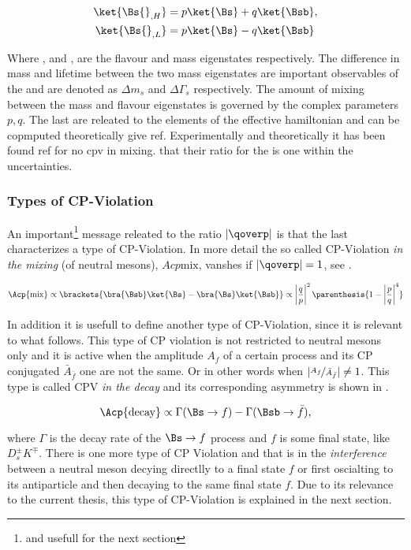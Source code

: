 \begin{align}
\ket{\Bs{}_{,H}} &= p \ket{\Bs} + q \ket{\Bsb}, \nonumber \\
\ket{\Bs{}_{,L}} &= p \ket{\Bs} - q \ket{\Bsb}
\label{bs_mass_eigen}
\end{align}

\noindent Where \ket{\Bs}, \ket{\Bsb} and ,  are the flavour and mass
eigenstates respectively. The difference in mass and lifetime between the two mass eigenstates are important
observables of the \BBbarSyst and are denoted as $\Delta m_s$ and $\Delta\Gamma_s$ respectively.
The amount of mixing between the mass and flavour eigenstates is governed by
the complex parameters $p,q$. The last are releated to the elements of the effective hamiltonian and can be
copmputed theoretically{\color{red} give ref}. Experimentally and theoretically it has been found{\color{red} ref for no cpv in mixing.}
that their ratio for the \BBbarSyst is one within the uncertainties.

\subsubsection{Types of CP-Violation}
An important\footnote{and usefull for the next section} message releated to the ratio $|\qoverp|$ is that
the last characterizes a type of CP-Violation. In more detail the so called CP-Violation {\it in the mixing} (of neutral mesons),
$Acp{\text{mix}}$, vanshes if $|\qoverp|= 1$, see .

\begin{equation}
\Acp{\text{mix}} \propto \brackets{\bra{\Bsb}\ket{\Bs} - \bra{\Bs}\ket{\Bsb}} \propto \left|\frac{q}{p}\right|^2 \parenthesis{ 1 - \left|\frac{p}{q}\right|^4}
\label{cpv_mixing}
\end{equation}

\noindent In addition it is usefull to define another type of CP-Violation, since it is relevant to what follows.
This type of CP violation is not restricted to neutral mesons only and it is active when the amplitude $A_f$ of a certain
process and its CP conjugated $\bar{A}_{\bar{f}}$ one are not the same. Or in other words when $|\nicefrac{A_f}{\bar{A}_{\bar{f}}}| \neq 1$.
This type is called CPV {\it in the decay} and its corresponding asymmetry is shown in .

\begin{equation}
\Acp{\text{decay}} \propto \Gamma(\Bs \rightarrow f) - \Gamma(\Bsb \rightarrow \bar{f}),
\label{cpv_decay}
\end{equation}

\noindent where $\Gamma$ is the decay rate of the $\Bs \rightarrow f$ process and $f$ is some final state,
like $D_s^{\pm}K^{\mp}$. There is one more type of CP Violation and that is in the {\it interference} between
a neutral meson decying directlly to a final state $f$ or first oscialting to its antiparticle and then decaying
to the same final state $f$. Due to its relevance to the current thesis, this type of CP-Violation is explained
in the next section.
